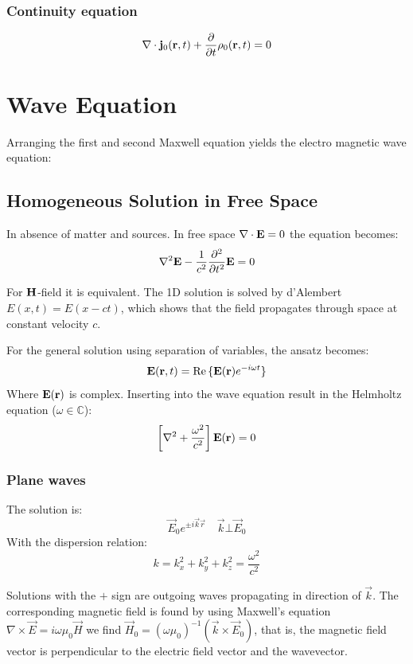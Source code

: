 \documentclass[a4paper, fontsize=8pt, landscape, DIV=1]{scrartcl}
\begin{document}
\begin{multicols*}{4}
  \subsubsection{Continuity equation}
  \[\nabla\cdot\mathbf{j}_0(\mathbf{r},t) + \frac{\partial}{\partial t}\rho_0(\mathbf{r},t) = 0\]

  \section{Wave Equation}
  Arranging the first and second Maxwell equation yields the electro magnetic wave equation:

  \subsection{Homogeneous Solution in Free Space}
  In absence of matter and sources. In free space $\nabla\cdot\mathbf{E}=0$ the equation becomes:
  \[\nabla^2\mathbf{E} - \frac{1}{c^2}\frac{\partial^2}{\partial t^2}\mathbf{E} = 0\]

  For $\mathbf{H}$-field it is equivalent. The 1D solution is solved by d'Alembert $E(x,t)=E(x-ct)$, which shows that the field propagates through space at constant velocity $c$.

  For the general solution using separation of variables, the ansatz becomes:
  \[\mathbf{E}(\mathbf{r},t) = \text{Re}\,\{\mathbf{E}(\mathbf{r}) e^{-i\omega t}\}\]
  Where $\mathbf{E}(\mathbf{r})$ is complex. Inserting into the wave equation result in the Helmholtz equation ($\omega\in\mathbb{C}$):
  \[\left[\nabla^2 + \frac{\omega^2}{c^2}\right]\mathbf{E}(\mathbf{r}) = 0\]

  \subsubsection{Plane waves}
  The solution is:
  \[\vec{E}_0 e^{\pm i\vec{k}\vec{r}} \quad \vec{k}\bot\vec{E}_0\]
  With the dispersion relation:
  \[k = k_x^2+k_y^2+k_z^2 = \frac{\omega^2}{c^2}\]

  Solutions with the $+$ sign are outgoing waves propagating in direction of $\vec{k}$.
  The corresponding magnetic field is found by using Maxwell's equation $\nabla\times\vec{E} = i\omega\mu_0\vec{H}$ we find $\vec{H}_0=(\omega\mu_0)^{-1}(\vec{k}\times\vec{E}_0)$, that is, the magnetic field vector is perpendicular to the electric field vector and the wavevector.


\end{multicols*}
\end{document}
